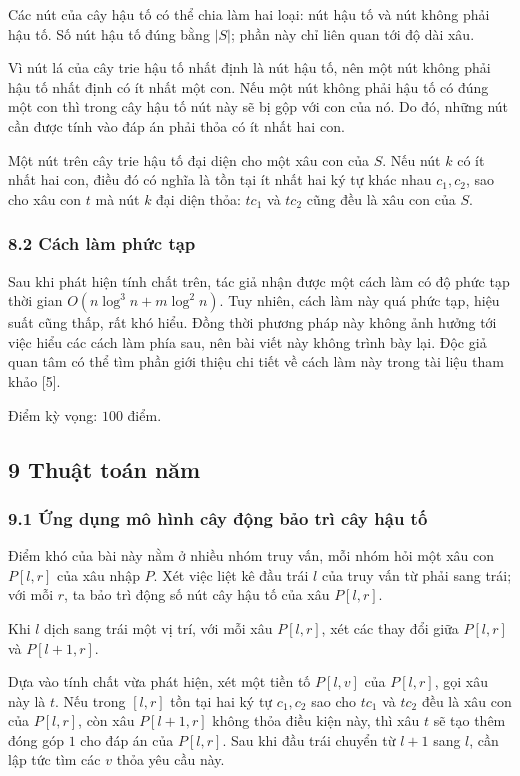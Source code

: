 \documentclass[11pt]{article}
\begin{document}
Các nút của cây hậu tố có thể chia làm hai loại: nút hậu tố và nút không phải
hậu tố. Số nút hậu tố đúng bằng \(\lvert S\rvert\); phần này chỉ liên quan tới
độ dài xâu.

Vì nút lá của cây trie hậu tố nhất định là nút hậu tố, nên một nút không phải
hậu tố nhất định có ít nhất một con. Nếu một nút không phải hậu tố có đúng một
con thì trong cây hậu tố nút này sẽ bị gộp với con của nó. Do đó, những nút cần
được tính vào đáp án phải thỏa có ít nhất hai con.

Một nút trên cây trie hậu tố đại diện cho một xâu con của \(S\). Nếu nút \(k\)
có ít nhất hai con, điều đó có nghĩa là tồn tại ít nhất hai ký tự khác nhau
\(c_1,c_2\), sao cho xâu con \(t\) mà nút \(k\) đại diện thỏa: \(tc_1\) và
\(tc_2\) cũng đều là xâu con của \(S\).

\subsubsection*{8.2 Cách làm phức tạp}

Sau khi phát hiện tính chất trên, tác giả nhận được một cách làm có độ phức tạp
thời gian \(O(n\log^3 n + m\log^2 n)\). Tuy nhiên, cách làm này quá phức tạp,
hiệu suất cũng thấp, rất khó hiểu. Đồng thời phương pháp này không ảnh hưởng
tới việc hiểu các cách làm phía sau, nên bài viết này không trình bày lại. Độc
giả quan tâm có thể tìm phần giới thiệu chi tiết về cách làm này trong tài liệu
tham khảo [5].

Điểm kỳ vọng: \(100\) điểm.

\subsection*{9 Thuật toán năm}

\subsubsection*{9.1 Ứng dụng mô hình cây động bảo trì cây hậu tố}

Điểm khó của bài này nằm ở nhiều nhóm truy vấn, mỗi nhóm hỏi một xâu con
\(P[l,r]\) của xâu nhập \(P\). Xét việc liệt kê đầu trái \(l\) của truy vấn từ
phải sang trái; với mỗi \(r\), ta bảo trì động số nút cây hậu tố của xâu
\(P[l,r]\).

Khi \(l\) dịch sang trái một vị trí, với mỗi xâu \(P[l,r]\), xét các thay đổi
giữa \(P[l,r]\) và \(P[l+1,r]\).

Dựa vào tính chất vừa phát hiện, xét một tiền tố \(P[l,v]\) của \(P[l,r]\), gọi
xâu này là \(t\). Nếu trong \([l,r]\) tồn tại hai ký tự \(c_1,c_2\) sao cho
\(tc_1\) và \(tc_2\) đều là xâu con của \(P[l,r]\), còn xâu \(P[l+1,r]\) không
thỏa điều kiện này, thì xâu \(t\) sẽ tạo thêm đóng góp \(1\) cho đáp án của
\(P[l,r]\). Sau khi đầu trái chuyển từ \(l+1\) sang \(l\), cần lập tức tìm các
\(v\) thỏa yêu cầu này.
\end{document}
